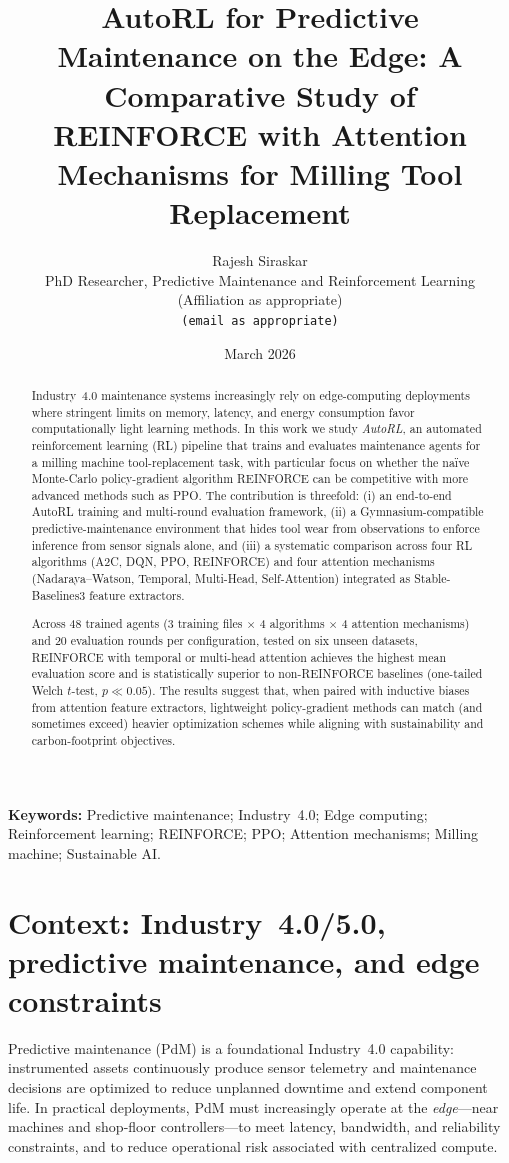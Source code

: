 \documentclass[11pt]{article}
\title{AutoRL for Predictive Maintenance on the Edge: \texorpdfstring{\newline}{ }A Comparative Study of REINFORCE with Attention Mechanisms for Milling Tool Replacement}
\author{Rajesh Siraskar\\
\small PhD Researcher, Predictive Maintenance and Reinforcement Learning\\
\small (Affiliation as appropriate)\\
\small \texttt{(email as appropriate)}
}
\date{March 2026}
\begin{document}
\maketitle

\begin{abstract}
Industry~4.0 maintenance systems increasingly rely on edge-computing deployments where stringent limits on memory, latency, and energy consumption favor computationally light learning methods. In this work we study \emph{AutoRL}, an automated reinforcement learning (RL) pipeline that trains and evaluates maintenance agents for a milling machine tool-replacement task, with particular focus on whether the na\"{i}ve Monte-Carlo policy-gradient algorithm \textsc{REINFORCE} can be competitive with more advanced methods such as \textsc{PPO}. The contribution is threefold: (i) an end-to-end AutoRL training and multi-round evaluation framework, (ii) a Gymnasium-compatible predictive-maintenance environment that hides tool wear from observations to enforce inference from sensor signals alone, and (iii) a systematic comparison across four RL algorithms (\textsc{A2C}, \textsc{DQN}, \textsc{PPO}, \textsc{REINFORCE}) and four attention mechanisms (Nadaraya--Watson, Temporal, Multi-Head, Self-Attention) integrated as Stable-Baselines3 feature extractors.

Across 48 trained agents (3 training files $\times$ 4 algorithms $\times$ 4 attention mechanisms) and 20 evaluation rounds per configuration, tested on six unseen datasets, \textsc{REINFORCE} with temporal or multi-head attention achieves the highest mean evaluation score and is statistically superior to non-\textsc{REINFORCE} baselines (one-tailed Welch $t$-test, $p\ll 0.05$). The results suggest that, when paired with inductive biases from attention feature extractors, lightweight policy-gradient methods can match (and sometimes exceed) heavier optimization schemes while aligning with sustainability and carbon-footprint objectives.
\end{abstract}

\textbf{Keywords:} Predictive maintenance; Industry~4.0; Edge computing; Reinforcement learning; \textsc{REINFORCE}; \textsc{PPO}; Attention mechanisms; Milling machine; Sustainable AI.

\section{Context: Industry~4.0/5.0, predictive maintenance, and edge constraints}
Predictive maintenance (PdM) is a foundational Industry~4.0 capability: instrumented assets continuously produce sensor telemetry and maintenance decisions are optimized to reduce unplanned downtime and extend component life. In practical deployments, PdM must increasingly operate at the \emph{edge}---near machines and shop-floor controllers---to meet latency, bandwidth, and reliability constraints, and to reduce operational risk associated with centralized compute.
\end{document}
